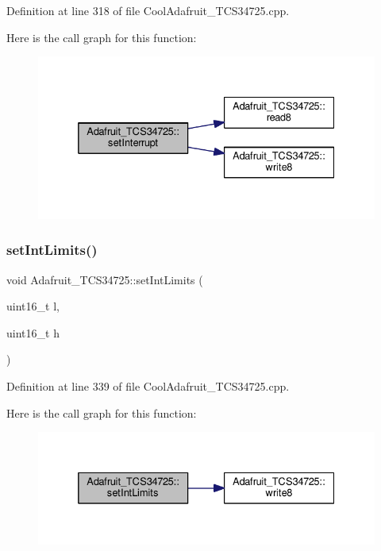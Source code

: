 Definition at line 318 of file Cool\+Adafruit\+\_\+\+T\+C\+S34725.\+cpp.

Here is the call graph for this function\+:\nopagebreak
\begin{figure}[H]
\begin{center}
\leavevmode
\includegraphics[width=332pt]{class_adafruit___t_c_s34725_ae477b116ac93cf075be20637207aee57_cgraph}
\end{center}
\end{figure}
\mbox{\label{class_adafruit___t_c_s34725_ac17b2447df066e30d1e64fe764f88770}} 
\subsubsection{\texorpdfstring{set\+Int\+Limits()}{setIntLimits()}}
{\footnotesize\ttfamily void Adafruit\+\_\+\+T\+C\+S34725\+::set\+Int\+Limits (\begin{DoxyParamCaption}\item[{uint16\+\_\+t}]{l,  }\item[{uint16\+\_\+t}]{h }\end{DoxyParamCaption})}



Definition at line 339 of file Cool\+Adafruit\+\_\+\+T\+C\+S34725.\+cpp.

Here is the call graph for this function\+:\nopagebreak
\begin{figure}[H]
\begin{center}
\leavevmode
\includegraphics[width=332pt]{class_adafruit___t_c_s34725_ac17b2447df066e30d1e64fe764f88770_cgraph}
\end{center}
\end{figure}
\mbox{\label{class_adafruit___t_c_s34725_aa526557ad0d76b3b6e31e6197de583e6}} 
